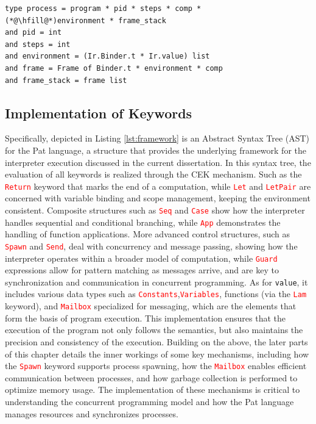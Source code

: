 \documentclass{l4proj}
\begin{document}
\noindent\begin{minipage}{\linewidth}
\lstset{style=Ocamlstyle}
\begin{lstlisting}[caption={Source code of CEK framework in Pat}, label={lst:types}]
type process = program * pid * steps * comp * 
(*@\hfill@*)environment * frame_stack
and pid = int
and steps = int
and environment = (Ir.Binder.t * Ir.value) list
and frame = Frame of Binder.t * environment * comp
and frame_stack = frame list
\end{lstlisting}
\end{minipage}


\subsection{Implementation of Keywords}
Specifically, depicted in Listing \ref{lst:framework} is an Abstract Syntax Tree (AST) for the Pat language, a structure that provides the underlying framework for the interpreter execution discussed in the current dissertation. In this syntax tree, the evaluation of all keywords is realized through the CEK mechanism. Such as the \textcolor{red}{\texttt{Return}} keyword that marks the end of a computation, while \textcolor{red}{\texttt{Let}} and \textcolor{red}{\texttt{LetPair}} are concerned with variable binding and scope management, keeping the environment consistent. Composite structures such as \textcolor{red}{\texttt{Seq}} and \textcolor{red}{\texttt{Case}} show how the interpreter handles sequential and conditional branching, while \textcolor{red}{\texttt{App}} demonstrates the handling of function applications. More advanced control structures, such as \textcolor{red}{\texttt{Spawn}} and \textcolor{red}{\texttt{Send}}, deal with concurrency and message passing, showing how the interpreter operates within a broader model of computation, while \textcolor{red}{\texttt{Guard}} expressions allow for pattern matching as messages arrive, and are key to synchronization and communication in concurrent programming. As for \texttt{value}, it includes various data types such as \textcolor{red}{\texttt{Constants}},\textcolor{red}{\texttt{Variables}}, functions (via the \textcolor{red}{\texttt{Lam}} keyword), and \textcolor{red}{\texttt{Mailbox}} specialized for messaging, which are the elements that form the basis of program execution. This implementation ensures that the execution of the program not only follows the semantics, but also maintains the precision and consistency of the execution. Building on the above, the later parts of this chapter details the inner workings of some key mechanisms, including how the \textcolor{red}{\texttt{Spawn}} keyword supports process spawning, how the \textcolor{red}{\texttt{Mailbox}} enables efficient communication between processes, and how garbage collection is performed to optimize memory usage. The implementation of these mechanisms is critical to understanding the concurrent programming model and how the Pat language manages resources and synchronizes processes.
\end{document}
